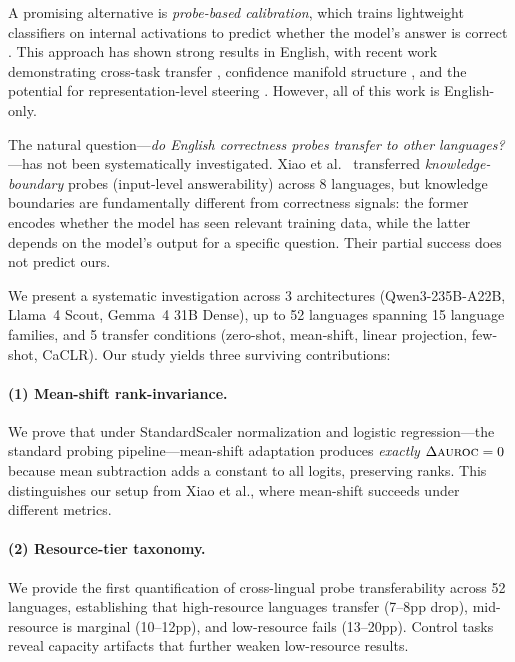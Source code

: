 \documentclass[11pt,a4paper]{article}
\newcommand{\auroc}{\textsc{auroc}}
\begin{document}
A promising alternative is \emph{probe-based calibration}, which trains lightweight classifiers on internal activations to predict whether the model's answer is correct \cite{miao2024coral,burns2023discovering}. This approach has shown strong results in English, with recent work demonstrating cross-task transfer \cite{miao2024coral}, confidence manifold structure \cite{luo2024confidence}, and the potential for representation-level steering \cite{miao2026orthogonality}. However, all of this work is English-only.

The natural question---\emph{do English correctness probes transfer to other languages?}---has not been systematically investigated. Xiao et al.\ \cite{xiao2025knowledge} transferred \emph{knowledge-boundary} probes (input-level answerability) across 8 languages, but knowledge boundaries are fundamentally different from correctness signals: the former encodes whether the model has seen relevant training data, while the latter depends on the model's output for a specific question. Their partial success does not predict ours.

We present a systematic investigation across 3 architectures (Qwen3-235B-A22B, Llama~4 Scout, Gemma~4 31B Dense), up to 52 languages spanning 15 language families, and 5 transfer conditions (zero-shot, mean-shift, linear projection, few-shot, CaCLR). Our study yields three surviving contributions:

\paragraph{(1) Mean-shift rank-invariance.} We prove that under StandardScaler normalization and logistic regression---the standard probing pipeline---mean-shift adaptation produces \emph{exactly} $\Delta\auroc{} = 0$ because mean subtraction adds a constant to all logits, preserving ranks. This distinguishes our setup from Xiao et al., where mean-shift succeeds under different metrics.

\paragraph{(2) Resource-tier taxonomy.} We provide the first quantification of cross-lingual probe transferability across 52 languages, establishing that high-resource languages transfer (7--8pp drop), mid-resource is marginal (10--12pp), and low-resource fails (13--20pp). Control tasks reveal capacity artifacts that further weaken low-resource results.
\end{document}
